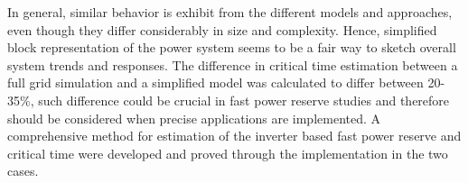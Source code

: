 In general, similar behavior is exhibit from the different models and approaches, even though they differ considerably in size and complexity. Hence, simplified block representation of the power system seems to be a fair way to sketch overall system trends and responses. The difference in critical time estimation between a full grid simulation and a simplified model was calculated to differ between 20-35\%, such difference could be crucial in fast power reserve studies and therefore should be considered when precise applications are implemented. A comprehensive method for estimation of the inverter based fast power reserve and critical time were developed and proved through the implementation in the two cases. 
